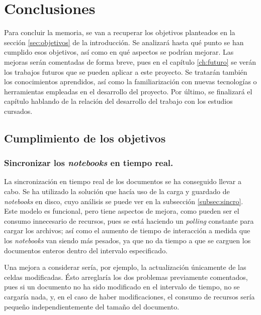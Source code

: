 \documentclass[11pt,spanish,listoffigures]{tfgetsinf}
\begin{document}


\chapter{Conclusiones}
\label{ch:conclusiones}

Para concluir la memoria, se van a recuperar los objetivos planteados en la sección \ref{sec:objetivos} de la introducción. Se analizará hasta qué punto se han cumplido esos objetivos, así como en qué aspectos se podrían mejorar. Las mejoras serán comentadas de forma breve, pues en el capítulo \ref{ch:futuro} se verán los trabajos futuros que se pueden aplicar a este proyecto. Se tratarán también los conocimientos aprendidos, así como la familiarización con nuevas tecnologías o herramientas empleadas en el desarrollo del proyecto. Por último, se finalizará el capítulo hablando de la relación del desarrollo del trabajo con los estudios cursados.



\section{Cumplimiento de los objetivos}
\label{sec:conc-objetivos}

\subsection{Sincronizar los \textit{notebooks} en tiempo real.}
\label{subsec:objetivos-conc-sincro}

La sincronización en tiempo real de los documentos se ha conseguido llevar a cabo. Se ha utilizado la solución que hacía uso de la carga y guardado de \textit{notebooks} en disco, cuyo análisis se puede ver en la subsección \ref{subsec:sincro}. Este modelo es funcional, pero tiene aspectos de mejora, como pueden ser el consumo innecesario de recursos, pues se está haciendo un \textit{\gls{polling}} constante para cargar los archivos; así como el aumento de tiempo de interacción a medida que los \textit{notebooks} van siendo más pesados, ya que no da tiempo a que se carguen los documentos enteros dentro del intervalo especificado.

Una mejora a considerar sería, por ejemplo, la actualización únicamente de las celdas modificadas. Ésto arreglaría los dos problemas previamente comentados, pues si un documento no ha sido modificado en el intervalo de tiempo, no se cargaría nada, y, en el caso de haber modificaciones, el consumo de recursos sería pequeño independientemente del tamaño del documento. 
\end{document}
